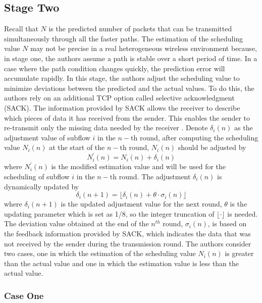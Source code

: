 \documentclass[sigplan,screen,nonacm]{acmart}
\begin{document}
\subsection{Stage Two}

Recall that $N$ is the predicted number of packets that can be transmitted simultaneously through all the faster paths. The estimation of the scheduling value $N$ may not be precise in a real heterogeneous wireless environment because, in stage one, the authors assume a path is stable over a short period of time. In a case where the path condition changes quickly, the prediction error will accumulate rapidly. In this stage, the authors adjust the scheduling value to minimize deviations between the predicted and the actual values. To do this, the authors rely on an additional TCP option called selective acknowledgment (SACK). The information provided by SACK allows the receiver to describe which pieces of data it has received from the sender. This enables the sender to re-transmit only the missing data needed by the receiver \cite{Stevens:2011}. Denote $\delta_{i}(n)$ as the adjustment value of subflow $i$ in the $n-\mathrm{th}$ round, after computing the scheduling value $N_{i}(n)$ at the start of the $n-\mathrm{th}$ round, $N_{i}(n)$ should be adjusted by
\begin{equation*} N_{i}^{\prime}(n)=N_{i}(n)+\delta_{i}(n) \label{eq:adjustment} \tag{9} \end{equation*}
where $N_{i}^{\prime}(n)$ is the modified estimation value and will be used for the scheduling of subflow $i$ in the  $n-\mathrm{th}$ round. The adjustment $\delta_{i}(n)$ is dynamically updated by
\begin{equation*} \delta_{i}(n+1)=\lfloor\delta_{i}(n)+\theta\cdot\sigma_{i}(n)\rfloor  \label{eq:adjustment-update} \tag{10} \end{equation*}
where $\delta_{i}(n+1)$ is the updated adjustment value for the next round, $\theta$ is the updating parameter which is set as 1/8, so the integer truncation of $\lfloor\cdot \rfloor$ is needed. The deviation value obtained at the end of the $n^{th}$ round, $\sigma_i(n)$, is based on the feedback information provided by SACK, which indicates the data that was not received by the sender during the transmission round. The authors consider two cases, one in which the estimation of the scheduling value $N_{i}(n)$ is greater than the actual value and one in which the estimation value is less than the actual value.

\subsubsection{Case One}
\end{document}
